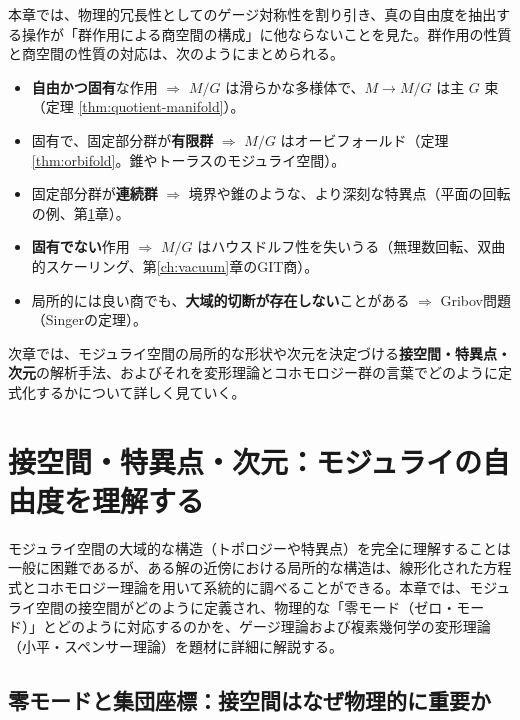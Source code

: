 \documentclass[uplatex, dvipdfmx, book]{jsbook}
\let\origsection\section
\let\origsubsection\subsection
\let\origsubsubsection\subsubsection
\newcommand{\chapter}{\origsection}
\renewcommand{\section}{\origsubsection}
\renewcommand{\subsection}{\origsubsubsection}
\renewcommand{\subsubsection}{\paragraph}
\begin{document}
本章では、物理的冗長性としてのゲージ対称性を割り引き、真の自由度を抽出する操作が「群作用による商空間の構成」に他ならないことを見た。群作用の性質と商空間の性質の対応は、次のようにまとめられる。
\begin{itemize}
    \item \textbf{自由かつ固有}な作用 $\Rightarrow$ $M/G$ は滑らかな多様体で、$M \to M/G$ は主 $G$ 束（定理 \ref{thm:quotient-manifold}）。
    \item 固有で、固定部分群が\textbf{有限群} $\Rightarrow$ $M/G$ はオービフォールド（定理 \ref{thm:orbifold}。錐やトーラスのモジュライ空間）。
    \item 固定部分群が\textbf{連続群} $\Rightarrow$ 境界や錐のような、より深刻な特異点（平面の回転の例、第\ref{ch:deformation}章）。
    \item \textbf{固有でない}作用 $\Rightarrow$ $M/G$ はハウスドルフ性を失いうる（無理数回転、双曲的スケーリング、第\ref{ch:vacuum}章のGIT商）。
    \item 局所的には良い商でも、\textbf{大域的切断が存在しない}ことがある $\Rightarrow$ Gribov問題（Singerの定理）。
\end{itemize}

次章では、モジュライ空間の局所的な形状や次元を決定づける\textbf{接空間・特異点・次元}の解析手法、およびそれを変形理論とコホモロジー群の言葉でどのように定式化するかについて詳しく見ていく。
\chapter{接空間・特異点・次元：モジュライの自由度を理解する}
\label{ch:deformation}

モジュライ空間の大域的な構造（トポロジーや特異点）を完全に理解することは一般に困難であるが、ある解の近傍における局所的な構造は、線形化された方程式とコホモロジー理論を用いて系統的に調べることができる。本章では、モジュライ空間の接空間がどのように定義され、物理的な「零モード（ゼロ・モード）」とどのように対応するのかを、ゲージ理論および複素幾何学の変形理論（小平・スペンサー理論）を題材に詳細に解説する。

\section{零モードと集団座標：接空間はなぜ物理的に重要か}
\end{document}
